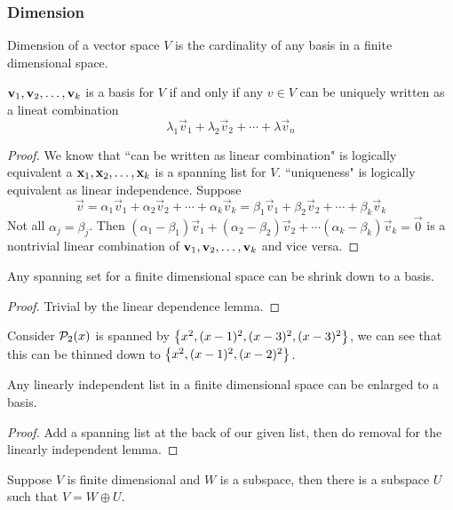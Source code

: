\subsubsection{Dimension}
\begin{definition}
    Dimension of a vector space $V$ is the cardinality of any basis in a finite dimensional space.
\end{definition}
\begin{proposition}
    ${\mathbf v}_1,{\mathbf v}_2, \ldots, {\mathbf v}_{k}$ is a basis for $V$ if and only if any $v \in V$ can be uniquely written as a lineat combination
    \[ \lambda_1 \vec v_1 + \lambda_2 \vec v_2 + \cdots + \lambda \vec v_n \]
\end{proposition}
\begin{proof}
    We know that ``can be written  as linear combination" is logically equivalent a ${\mathbf x}_1,{\mathbf x}_2, \ldots, {\mathbf x}_{k}$ is a spanning list for $V$. ``uniqueness" is logically equivalent as linear independence. Suppose
    \[ \vec v = \alpha_1 \vec v_1 + \alpha_2 \vec v_2 + \cdots + \alpha_k \vec v_k = \beta_1 \vec v_1 + \beta_2 \vec v_2 + \cdots + \beta_k \vec v_k\]
    Not all $\alpha_j = \beta_j$. Then $(\alpha_1 -\beta_1) \vec v_1 + (\alpha_2 - \beta_2) \vec v_2 + \cdots (\alpha_k - \beta_k) \vec v_k = \vec 0$ is a nontrivial linear combination of ${\mathbf v}_1,{\mathbf v}_2, \ldots, {\mathbf v}_{k}$ and vice versa. 
\end{proof}
\begin{theorem}
    Any spanning set for a finite dimensional space can be shrink down to a basis.
\end{theorem}
\begin{proof}
    Trivial by the linear dependence lemma.
\end{proof}
\begin{example}
    Consider $\mathcal P_2(x)$ is spanned by $\left\{ x^2, (x-1)^2, (x-3)^2, (x-3)^2\right\}$, we can see that this can be thinned down to $\left\{ x^2, (x-1)^2, (x-2)^2 \right\}$.
\end{example}
\begin{corollary}
    Any linearly independent list in a finite dimensional space can be enlarged to a basis.
\end{corollary}
\begin{proof}
    Add a spanning list at the back of our given list, then do removal for the linearly independent lemma.
\end{proof}
\begin{theorem}
    Suppose $V$ is finite dimensional and $W$ is a subspace, then there is a subspace $U$ such that $V = W \oplus U$.
\end{theorem}
